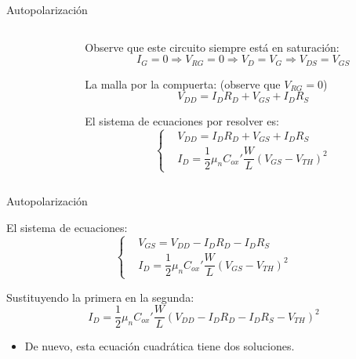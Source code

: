\documentclass[t,aspectratio=169]{beamer}
\begin{document}
\begin{frame}{Autopolarización}
\begin{columns}
\begin{column}{0.25\textwidth}
\end{column}

\begin{column}{0.75\textwidth}

Observe que este circuito siempre está en saturación:
\[ I_G = 0 \Rightarrow V_{RG} = 0 \Rightarrow V_D = V_G \Rightarrow V_{DS} = V_{GS} \]

La malla por la compuerta: (observe que $V_{RG} = 0$)
\[ V_{DD} = I_D R_D + V_{GS} + I_D R_S \]

El sistema de ecuaciones por resolver es:
\[ \begin{cases}
    & V_{DD} = I_D R_D + V_{GS} + I_D R_S \\
    & I_D = \dfrac{1}{2} \mu_n C_{ox}' \dfrac{W}{L} (V_{GS} - V_{TH})^2
\end{cases} \]

\end{column}

\end{columns}

\end{frame}


\begin{frame}{Autopolarización}

El sistema de ecuaciones:
\[ \begin{cases}
    & V_{GS} = V_{DD} - I_D R_D - I_D R_S \\
    & I_D = \dfrac{1}{2} \mu_n C_{ox}' \dfrac{W}{L} (V_{GS} - V_{TH})^2
\end{cases} \]

Sustituyendo la primera en la segunda:
\[ I_D = \dfrac{1}{2} \mu_n C_{ox}' \dfrac{W}{L} \left(V_{DD} - I_D R_D - I_D R_S - V_{TH}\right)^2 \]

\begin{itemize}
    \item De nuevo, esta ecuación cuadrática tiene dos soluciones.
\end{itemize}

\end{frame}
\end{document}
